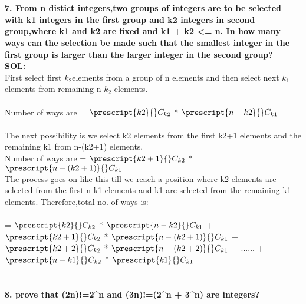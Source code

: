 \documentclass[8pt,a4paper]{article}
\newcommand\Mycomb[2][n]{\prescript{#1\mkern-0.5mu}{}C_{#2}}
\begin{document}
\section{}

\textbf{7. From n distict integers,two groups of integers are to be selected with k1 integers in the
first group and k2 integers in second group,where k1 and k2 are fixed and k1 + k2 <= n.
In how many ways can the selection be made such that the smallest integer in the first
group is larger than the larger integer in the second group?}\\

\textbf{SOL:}\\First select first $k_2$elements from a group of n elements and then select next $k_1$elements from remaining n-$k_2$ elements.\\
\\Number of ways are = $\Mycomb[k2]{k2}$ * $\Mycomb[n-k2]{k1}$\\
\\The next possibility is we select k2 elements from the first k2+1 elements and the remaining k1
from n-(k2+1) elements.\\
Number of ways are = $\Mycomb[k2 +1]{k2}$ * $\Mycomb[n-(k2+1)]{k1}$\\
The process goes on like this till we reach a position where k2 elements are selected from the first
n-k1 elements and k1 are selected from the remaining k1 elements.
Therefore,total no. of ways is:\\
\\= $\Mycomb[k2]{k2}$ * $\Mycomb[n-k2]{k1}$ + $\Mycomb[k2 +1]{k2}$ * $\Mycomb[n-(k2 +1)]{k1}$ + $\Mycomb[k2 +2]{k2}$ * $\Mycomb[n-(k2 +2)]{k1}$ + ...... +$\Mycomb[n-k1]{k2}$ * $\Mycomb[k1]{k1}$\\

\section{}

\textbf{8. prove that (2n)!=2^n and (3n)!=(2^n + 3^n) are integers?}\\
\end{document}
